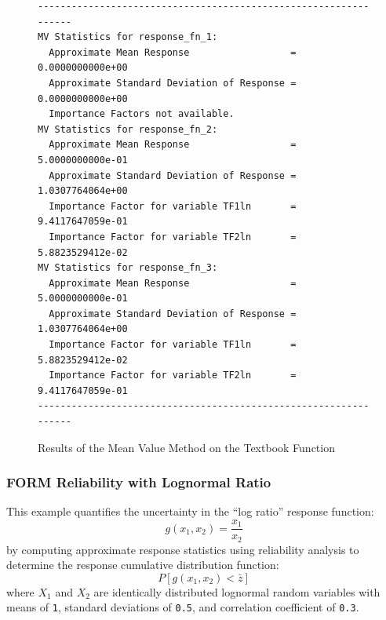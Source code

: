 \begin{figure}[htbp!]
\centering
\begin{bigbox}
\begin{small}
\begin{verbatim}
-----------------------------------------------------------------
MV Statistics for response_fn_1:
  Approximate Mean Response                  =  0.0000000000e+00
  Approximate Standard Deviation of Response =  0.0000000000e+00
  Importance Factors not available.
MV Statistics for response_fn_2:
  Approximate Mean Response                  =  5.0000000000e-01
  Approximate Standard Deviation of Response =  1.0307764064e+00
  Importance Factor for variable TF1ln       =  9.4117647059e-01
  Importance Factor for variable TF2ln       =  5.8823529412e-02
MV Statistics for response_fn_3:
  Approximate Mean Response                  =  5.0000000000e-01
  Approximate Standard Deviation of Response =  1.0307764064e+00
  Importance Factor for variable TF1ln       =  5.8823529412e-02
  Importance Factor for variable TF2ln       =  9.4117647059e-01
-----------------------------------------------------------------
\end{verbatim}
\end{small}
\end{bigbox}
\caption{Results of the Mean Value Method on the Textbook Function}
\label{uq:examples:mv_results}
\end{figure}

\subsubsection{FORM Reliability with Lognormal Ratio}

This example quantifies the uncertainty in the ``log ratio'' response
function:
\begin{equation}
g(x_1,x_2) = \frac{x_1}{x_2}
\end{equation}
by computing approximate response statistics using reliability
analysis to determine the response cumulative distribution function:
\begin{equation}
P[g(x_1,x_2) < \bar{z}]
\end{equation}
where $X_1$ and $X_2$ are identically distributed lognormal random
variables with means of \texttt{1}, standard deviations of
\texttt{0.5}, and correlation coefficient of \texttt{0.3}.

